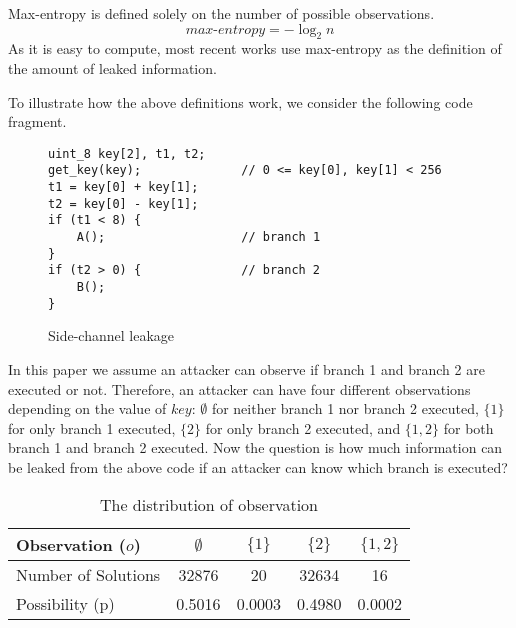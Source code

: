 Max-entropy is defined solely on the number of possible observations.
\begin{displaymath}
    \mathit{max\text{-}entropy} = -\log_2{n}
\end{displaymath}
As it is easy to compute, most recent works use max-entropy as the definition of
the amount of leaked information.

To illustrate how the above definitions work, we consider the following code
fragment.

\begin{figure}[h!]
    \centering
    \begin{lstlisting}[xleftmargin=.03\textwidth,xrightmargin=.01\textwidth]
uint_8 key[2], t1, t2;
get_key(key);              // 0 <= key[0], key[1] < 256
t1 = key[0] + key[1];
t2 = key[0] - key[1];
if (t1 < 8) {
    A();                   // branch 1
}
if (t2 > 0) {              // branch 2
    B();
}
\end{lstlisting}
    \caption{Side-channel leakage}
    \label{fig:side-channel}
\end{figure}
In this paper we assume an attacker can observe if branch 1 and branch 2 are
executed or not. Therefore, an attacker can have four different observations
depending on the value of $\mathit{key}$: $\emptyset$ for neither branch 1 nor
branch 2 executed, $\{1\}$ for only branch 1 executed, $\{2\}$ for only branch 2
executed, and $\{1, 2\}$ for both branch 1 and branch 2 executed. Now the
question is how much information can be leaked from the above code if an
attacker can know which branch is executed?

\begin{table}[ht]
    \centering
    \caption{The distribution of observation}\label{shtable}
    \begin{tabular}{l|cccc}
        \hline
        Observation ($o$)   & $\emptyset$ & ${\{1\}}$ & ${\{2\}}$ & ${\{1, 2\}}$ \\ \hline
        Number of Solutions & 32876       & 20        & 32634     & 16           \\ \hline
        Possibility (p)     & 0.5016      & 0.0003    & 0.4980    & 0.0002       \\
        \hline
    \end{tabular}
\end{table}


